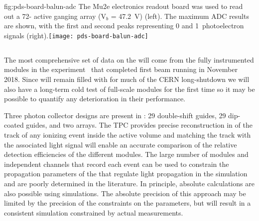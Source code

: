 \begin{dunefigure}
{fig:pds-board-balun-adc}
{The Mu2e electronics readout board was used to read out a 72- active ganging array (V$_b$ = \SI{47.2}{V}) (left). The maximum ADC results are shown, with the first and second peaks representing 0 and 1~photoelectron signals (right).}\texttt{[image: pds-board-balun-adc]} 
\vspace{-7.0cm}
\end{dunefigure}


\subsection{}
\label{sec:valid-pdsp}

The most comprehensive set of data on the  will come from the fully instrumented modules in the  experiment~\cite{Abi:2017aow} that completed first beam running in November \num{2018}. 
Since  will remain filled with \lar for much of the CERN long-shutdown we will also have a long-term cold test of full-scale  modules for the first time so it may be possible to quantify any deterioration in their performance.


Three photon collector designs are present in : \num{29} double-shift guides, \num{29} dip-coated guides, and two  arrays. 
The TPC provides precise reconstruction in \threed of the track of any ionizing event inside the active volume and matching the track with the associated light signal will enable an accurate comparison of the relative detection efficiencies of the different  modules. 
The large number of modules and independent channels that record each event can be used to constrain the propagation parameters of the \lar that regulate  light propagation in the simulation and are poorly determined in the literature. %
In principle, absolute calculations are also possible using  simulations.
The absolute precision of this approach may be limited by the precision of the constraints on the parameters, but will result in a consistent simulation constrained by actual measurements. 


